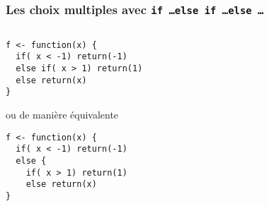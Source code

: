 \documentclass[10pt]{beamer}
\begin{document}
\begin{frame}[fragile]
  \frametitle{Les choix multiples avec \texttt{if \dots else if \dots else \dots}}
  
\begin{columns}[c]
\begin{column}{0.48\textwidth}
  \begin{lstlisting}[style=editor]
f <- function(x) {
  if( x < -1) return(-1)
  else if( x > 1) return(1)
  else return(x)
}   
\end{lstlisting}

ou de manière équivalente
\begin{lstlisting}[style=editor]
f <- function(x) {
  if( x < -1) return(-1)
  else {
    if( x > 1) return(1)
    else return(x)
}
\end{lstlisting}
\end{column}
\begin{column}{0.48\textwidth}
\end{column}
\end{columns}




\end{frame}
\end{document}
